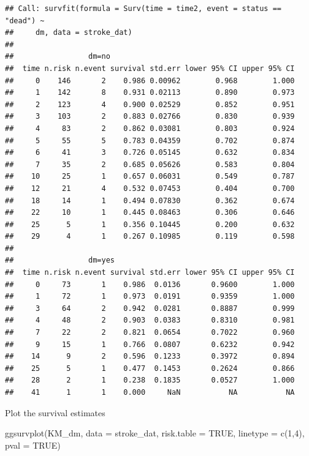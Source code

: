 \documentclass[
]{book}
\makeatletter
\newenvironment{Shaded}{\begin{snugshade}}{\end{snugshade}}
\newcommand{\AttributeTok}[1]{\textcolor[rgb]{0.61,0.61,0.61}{#1}}
\newcommand{\ConstantTok}[1]{\textcolor[rgb]{0,0,0}{#1}}
\newcommand{\DecValTok}[1]{\textcolor[rgb]{0.06,0.06,0.06}{#1}}
\newcommand{\FunctionTok}[1]{\textcolor[rgb]{0,0,0}{#1}}
\newcommand{\NormalTok}[1]{#1}
\newenvironment{kframe}{%
\medskip{}
\setlength{\fboxsep}{.8em}
 \def\at@end@of@kframe{}%
 \ifinner\ifhmode%
  \def\at@end@of@kframe{\end{minipage}}%
  \begin{minipage}{\columnwidth}%
 \fi\fi%
 \def\FrameCommand##1{\hskip\@totalleftmargin \hskip-\fboxsep
 \colorbox{shadecolor}{##1}\hskip-\fboxsep
     \hskip-\linewidth \hskip-\@totalleftmargin \hskip\columnwidth}%
 \MakeFramed {\advance\hsize-\width
   \@totalleftmargin\z@ \linewidth\hsize
   \@setminipage}}%
 {\par\unskip\endMakeFramed%
 \at@end@of@kframe}
\renewenvironment{Shaded}{\begin{kframe}}{\end{kframe}}
\makeatother
\begin{document}
\begin{verbatim}
## Call: survfit(formula = Surv(time = time2, event = status == "dead") ~ 
##     dm, data = stroke_dat)
## 
##                 dm=no 
##  time n.risk n.event survival std.err lower 95% CI upper 95% CI
##     0    146       2    0.986 0.00962        0.968        1.000
##     1    142       8    0.931 0.02113        0.890        0.973
##     2    123       4    0.900 0.02529        0.852        0.951
##     3    103       2    0.883 0.02766        0.830        0.939
##     4     83       2    0.862 0.03081        0.803        0.924
##     5     55       5    0.783 0.04359        0.702        0.874
##     6     41       3    0.726 0.05145        0.632        0.834
##     7     35       2    0.685 0.05626        0.583        0.804
##    10     25       1    0.657 0.06031        0.549        0.787
##    12     21       4    0.532 0.07453        0.404        0.700
##    18     14       1    0.494 0.07830        0.362        0.674
##    22     10       1    0.445 0.08463        0.306        0.646
##    25      5       1    0.356 0.10445        0.200        0.632
##    29      4       1    0.267 0.10985        0.119        0.598
## 
##                 dm=yes 
##  time n.risk n.event survival std.err lower 95% CI upper 95% CI
##     0     73       1    0.986  0.0136       0.9600        1.000
##     1     72       1    0.973  0.0191       0.9359        1.000
##     3     64       2    0.942  0.0281       0.8887        0.999
##     4     48       2    0.903  0.0383       0.8310        0.981
##     7     22       2    0.821  0.0654       0.7022        0.960
##     9     15       1    0.766  0.0807       0.6232        0.942
##    14      9       2    0.596  0.1233       0.3972        0.894
##    25      5       1    0.477  0.1453       0.2624        0.866
##    28      2       1    0.238  0.1835       0.0527        1.000
##    41      1       1    0.000     NaN           NA           NA
\end{verbatim}

Plot the survival estimates

\begin{Shaded}
\begin{Highlighting}[]
\FunctionTok{ggsurvplot}\NormalTok{(KM\_dm, }\AttributeTok{data =}\NormalTok{ stroke\_dat, }\AttributeTok{risk.table =} \ConstantTok{TRUE}\NormalTok{, }
           \AttributeTok{linetype =} \FunctionTok{c}\NormalTok{(}\DecValTok{1}\NormalTok{,}\DecValTok{4}\NormalTok{), }\AttributeTok{pval =} \ConstantTok{TRUE}\NormalTok{)}
\end{Highlighting}
\end{Shaded}
\end{document}
